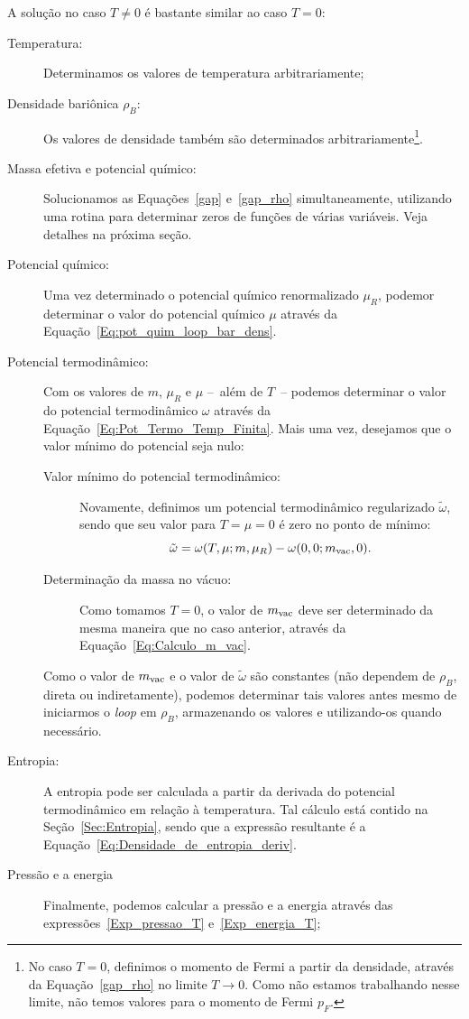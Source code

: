 A solução no caso $T \neq 0$ é bastante similar ao caso $T = 0$: 
\begin{description}
	\item[Temperatura:] Determinamos os valores de temperatura arbitrariamente;
	\item[Densidade bariônica $\rho_B$:] Os valores de densidade também são determinados arbitrariamente\footnote{No caso $T = 0$, definimos o momento de Fermi a partir da densidade, através da Equação~\eqref{gap_rho} no limite $T \to 0$. Como não estamos trabalhando nesse limite, não temos valores para o momento de Fermi $p_F$.}.
	\item[Massa efetiva e potencial químico:] Solucionamos as Equações~\eqref{gap} e~\eqref{gap_rho} simultaneamente, utilizando uma rotina para determinar zeros de funções de várias variáveis. Veja detalhes na próxima seção.
	\item[Potencial químico:] Uma vez determinado o potencial químico renormalizado $\mu_R$, podemor determinar o valor do potencial químico $\mu$ através da Equação~\eqref{Eq:pot_quim_loop_bar_dens}.
	\item[Potencial termodinâmico:] Com os valores de $m$, $\mu_R$ e $\mu$ --~além de $T$~-- podemos determinar o valor do potencial termodinâmico $\omega$ através da Equação~\ref{Eq:Pot_Termo_Temp_Finita}. Mais uma vez, desejamos que o valor mínimo do potencial seja nulo:
		\begin{description}
			\item[Valor mínimo do potencial termodinâmico:] Novamente, definimos um potencial termodinâmico regularizado $\tilde\omega$, sendo que seu valor para $T = \mu = 0$ é zero no ponto de mínimo:
				\begin{equation}
					\tilde\omega = \omega(T,\mu;m,\mu_R) - \omega(0,0;m_{\rm{vac}},0).
				\end{equation}
			\item[Determinação da massa no vácuo:] Como tomamos $T = 0$, o valor de $m_{\rm{vac}}$ deve ser determinado da mesma maneira que no caso anterior, através da Equação~\eqref{Eq:Calculo_m_vac}.
		\end{description}
		Como o valor de $m_{\rm{vac}}$ e o valor de $\tilde\omega$ são constantes (não dependem de $\rho_B$, direta ou indiretamente), podemos determinar tais valores antes mesmo de iniciarmos o \emph{loop} em $\rho_B$, armazenando os valores e utilizando-os quando necessário.
	\item[Entropia:] A entropia pode ser calculada a partir da derivada do potencial termodinâmico em relação à temperatura. Tal cálculo está contido na Seção~\ref{Sec:Entropia}, sendo que a expressão resultante é a Equação~\eqref{Eq:Densidade_de_entropia_deriv}.
	\item[Pressão e a energia] Finalmente, podemos calcular a pressão e a energia através das expressões~\eqref{Exp_pressao_T} e~\eqref{Exp_energia_T};
\end{description}

